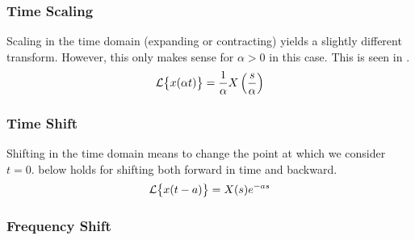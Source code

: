 \subsubsection{Time Scaling}\label{subsubsec:Laplace_Time_Scaling}
Scaling in the time domain (expanding or contracting) yields a slightly different transform.
However, this only makes sense for $\alpha > 0$ in this case.
This is seen in .
\begin{equation}\label{eq:Laplace_Time_Scaling}
  \operatorname{\mathcal{L}} \bigl\lbrace x(\alpha t) \bigr\rbrace = \frac{1}{\alpha} X \left( \frac{s}{\alpha} \right)
\end{equation}

\subsubsection{Time Shift}\label{subsubsec:Laplace_Time_Shift}
Shifting in the time domain means to change the point at which we consider $t=0$.
 below holds for shifting both forward in time and backward.
\begin{equation}\label{eq:Laplace_Time_Shifting}
  \operatorname{\mathcal{L}} \bigl\lbrace x(t-a) \bigr\rbrace = X(s) e^{-a s}
\end{equation}

\subsubsection{Frequency Shift}\label{subsubsec:Laplace_Frequency_Shift}

